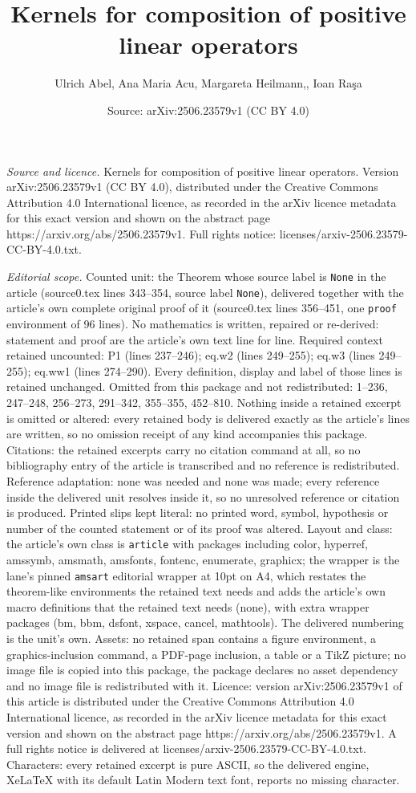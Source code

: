 \documentclass[10pt,a4paper]{amsart}
\title[Kernels for composition of positive linear operators]{Kernels for composition of positive linear operators}
\author{Ulrich Abel, Ana Maria Acu, Margareta Heilmann,, Ioan Ra\c{s}a}
\date{Source: arXiv:2506.23579v1 (CC BY 4.0)}
\begin{document}
\maketitle

\noindent\emph{Source and licence.} Kernels for composition of positive linear operators. Version arXiv:2506.23579v1 (CC BY 4.0), distributed under the Creative Commons Attribution 4.0 International licence, as recorded in the arXiv licence metadata for this exact version and shown on the abstract page https://arxiv.org/abs/2506.23579v1. Full rights notice: licenses/arxiv-2506.23579-CC-BY-4.0.txt.\par\smallskip

\noindent\textit{Editorial scope.} Counted unit: the Theorem whose source label is \texttt{None} in the article (source0.tex lines 343--354, source label \texttt{None}), delivered together with the article's own complete original proof of it (source0.tex lines 356--451, one \texttt{proof} environment of 96 lines). No mathematics is written, repaired or re-derived: statement and proof are the article's own text line for line. Required context retained uncounted: P1 (lines 237--246); eq.w2 (lines 249--255); eq.w3 (lines 249--255); eq.ww1 (lines 274--290). Every definition, display and label of those lines is retained unchanged. Omitted from this package and not redistributed: 1--236, 247--248, 256--273, 291--342, 355--355, 452--810. Nothing inside a retained excerpt is omitted or altered: every retained body is delivered exactly as the article's lines are written, so no omission receipt of any kind accompanies this package. Citations: the retained excerpts carry no citation command at all, so no bibliography entry of the article is transcribed and no reference is redistributed. Reference adaptation: none was needed and none was made; every reference inside the delivered unit resolves inside it, so no unresolved reference or citation is produced. Printed slips kept literal: no printed word, symbol, hypothesis or number of the counted statement or of its proof was altered. Layout and class: the article's own class is \texttt{article} with packages including color, hyperref, amssymb, amsmath, amsfonts, fontenc, enumerate, graphicx; the wrapper is the lane's pinned \texttt{amsart} editorial wrapper at 10pt on A4, which restates the theorem-like environments the retained text needs and adds the article's own macro definitions that the retained text needs (none), with extra wrapper packages (bm, bbm, dsfont, xspace, cancel, mathtools). The delivered numbering is the unit's own. Assets: no retained span contains a figure environment, a graphics-inclusion command, a PDF-page inclusion, a table or a TikZ picture; no image file is copied into this package, the package declares no asset dependency and no image file is redistributed with it. Licence: version arXiv:2506.23579v1 of this article is distributed under the Creative Commons Attribution 4.0 International licence, as recorded in the arXiv licence metadata for this exact version and shown on the abstract page https://arxiv.org/abs/2506.23579v1. A full rights notice is delivered at licenses/arxiv-2506.23579-CC-BY-4.0.txt. Characters: every retained excerpt is pure ASCII, so the delivered engine, XeLaTeX with its default Latin Modern text font, reports no missing character.
\end{document}
